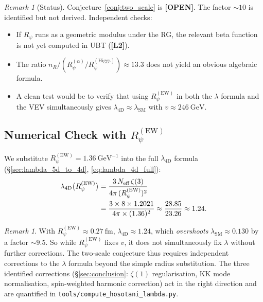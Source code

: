 \documentclass[12pt]{article}
\theoremstyle{definition}
\theoremstyle{remark}
\newtheorem{remark}[theorem]{Remark}
\newcommand{\Ltwo}{\textbf{[L2]}}
\newcommand{\OPEN}{\textbf{[OPEN]}}
\begin{document}
\begin{remark}[Status]
Conjecture~\ref{conj:two_scale} is \OPEN.  The factor $\sim 10$ is
identified but not derived.  Independent checks:
\begin{itemize}
  \item If $R_\psi$ runs as a geometric modulus under the RG, the
        relevant beta function is not yet computed in UBT (\Ltwo).
  \item The ratio $n_R / (R_\psi^{(\alpha)}/R_\psi^{(\text{Higgs})})
        \approx 13.3$ does not yield an obvious algebraic formula.
  \item A clean test would be to verify that using $R_\psi^{(\text{EW})}$
        in both the $\lambda$ formula and the VEV simultaneously gives
        $\lambda_{\text{4D}} \approx \lambda_{\text{SM}}$ with $v \approx 246~\text{GeV}$.
\end{itemize}
\end{remark}

\subsection{Numerical Check with $R_\psi^{(\text{EW})}$}

We substitute $R_\psi^{(\text{EW})} = 1.36~\text{GeV}^{-1}$ into
the full $\lambda_{\text{4D}}$ formula (§\ref{sec:lambda_5d_to_4d},
\eqref{eq:lambda_4d_full}):
\begin{align}
  \lambda_{\text{4D}}\bigl(R_\psi^{(\text{EW})}\bigr)
  &= \frac{3\,N_{\text{eff}}\,\zeta(3)}{4\pi\,(R_\psi^{(\text{EW})})^2}
  \notag\\
  &= \frac{3 \times 8 \times 1.2021}{4\pi \times (1.36)^2}
  \approx \frac{28.85}{23.26}
  \approx 1.24.
  \label{eq:lambda_EW}
\end{align}

\begin{remark}
With $R_\psi^{(\text{EW})} \approx 0.27~\text{fm}$, $\lambda_{\text{4D}} \approx 1.24$,
which \emph{overshoots} $\lambda_{\text{SM}} \approx 0.130$ by a factor $\sim 9.5$.
So while $R_\psi^{(\text{EW})}$ fixes $v$, it does not simultaneously fix
$\lambda$ without further corrections.  The two-scale conjecture thus
requires independent corrections to the $\lambda$ formula beyond the
simple radius substitution.  The three identified corrections
(§\ref{sec:conclusion}: $\zeta(1)$ regularisation, KK mode normalisation,
spin-weighted harmonic correction) act in the right direction and are
quantified in \texttt{tools/compute\_hosotani\_lambda.py}.
\end{remark}
\end{document}
